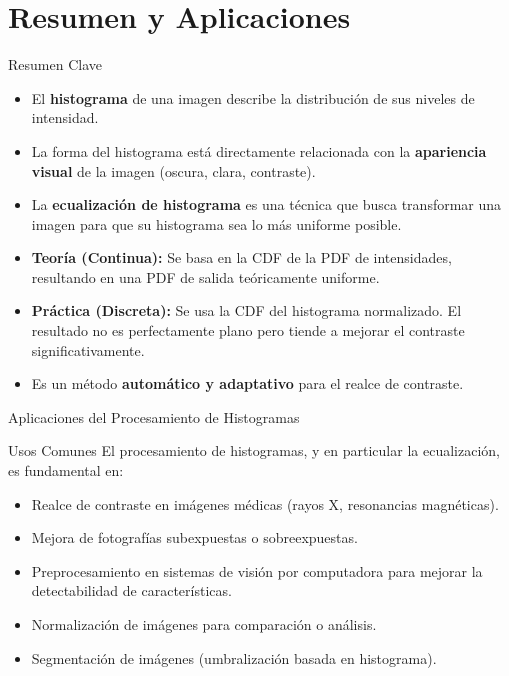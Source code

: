 \documentclass{beamer}
\begin{document}
\section{Resumen y Aplicaciones}

\begin{frame}{Resumen Clave}
  \begin{itemize}
    \item El \textbf{histograma} de una imagen describe la distribución de sus niveles de intensidad.
    \item La forma del histograma está directamente relacionada con la \textbf{apariencia visual} de la imagen (oscura, clara, contraste).
    \item La \textbf{ecualización de histograma} es una técnica que busca transformar una imagen para que su histograma sea lo más uniforme posible.
    \item \textbf{Teoría (Continua):} Se basa en la CDF de la PDF de intensidades, resultando en una PDF de salida teóricamente uniforme.
    \item \textbf{Práctica (Discreta):} Se usa la CDF del histograma normalizado. El resultado no es perfectamente plano pero tiende a mejorar el contraste significativamente.
    \item Es un método \textbf{automático y adaptativo} para el realce de contraste.
  \end{itemize}
\end{frame}

\begin{frame}{Aplicaciones del Procesamiento de Histogramas}
  \begin{block}{Usos Comunes}
    El procesamiento de histogramas, y en particular la ecualización, es fundamental en:
  \end{block}
    \begin{itemize}
        \item Realce de contraste en imágenes médicas (rayos X, resonancias magnéticas).
        \item Mejora de fotografías subexpuestas o sobreexpuestas.
        \item Preprocesamiento en sistemas de visión por computadora para mejorar la detectabilidad de características.
        \item Normalización de imágenes para comparación o análisis.
        \item Segmentación de imágenes (umbralización basada en histograma).
    \end{itemize}
\end{frame}
\end{document}
